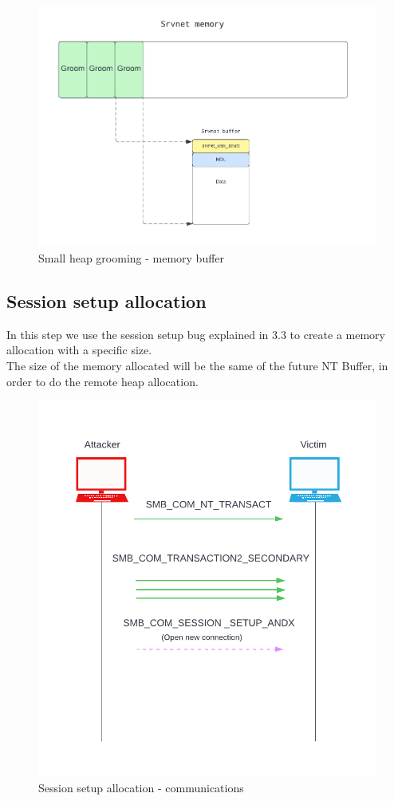 \begin{figure}[ht!]
    \centering
      \includegraphics[scale=0.5]{images/exploit_1_buff.png}
      \caption{Small heap grooming - memory buffer}
\end{figure}


\clearpage
\subsection{Session setup allocation}
In this step we use the session setup bug explained in 3.3 to create a memory allocation with a specific size.\\
The size of the memory allocated will be the same of the future NT Buffer, in order to do the remote heap allocation.\\

\begin{figure}[ht!]
    \centering
      \includegraphics[scale=0.5]{images/exploit_2_comm.png}
      \caption{Session setup allocation - communications}
\end{figure}

